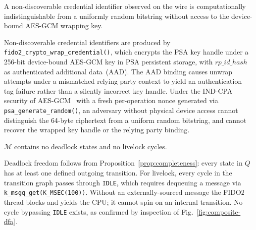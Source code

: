 \begin{proposition}
\label{prop:opacity}
A non-discoverable credential identifier observed on the
wire is computationally indistinguishable from a uniformly
random bitstring without access to the device-bound
AES-GCM wrapping key.
\end{proposition}
\IEEEproof
Non-discoverable credential identifiers are produced by
\texttt{fido2\_crypto\_wrap\_credential()}, which encrypts
the PSA key handle under a 256-bit device-bound AES-GCM key
in PSA persistent storage, with $\mathit{rp\_id\_hash}$ as
authenticated additional data~(AAD).
The AAD binding causes unwrap attempts under a mismatched
relying party context to yield an authentication tag failure
rather than a silently incorrect key handle.
Under the IND-CPA security of AES-GCM~\cite{iwata-gcm}
with a fresh per-operation nonce generated via
\texttt{psa\_generate\_random()}, an adversary without
physical device access cannot distinguish the 64-byte
ciphertext from a uniform random bitstring, and cannot
recover the wrapped key handle or the relying party binding.
\IEEEQED

\begin{proposition}
\label{prop:deadlock}
$\mathcal{M}$ contains no deadlock states and no livelock
cycles.
\end{proposition}
\IEEEproof
Deadlock freedom follows from
Proposition~\ref{prop:completeness}: every state in $Q$
has at least one defined outgoing transition.
For livelock, every cycle in the transition graph passes
through \texttt{IDLE}, which requires dequeuing a message
via \texttt{k\_msgq\_get(K\_MSEC(100))}.
Without an externally-sourced message the FIDO2 thread
blocks and yields the CPU; it cannot spin on an internal
transition.
No cycle bypassing \texttt{IDLE} exists, as confirmed by
inspection of Fig.~\ref{fig:composite-dfa}.
\IEEEQED

